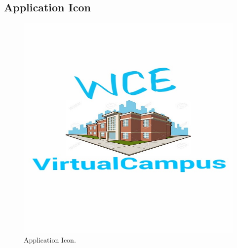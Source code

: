 \documentclass{article}
\begin{document}
\subsection{Application Icon}
\begin{center}
\begin{figure}[h]
	\includegraphics[scale=.2]{Icon.png}
	\caption{Application Icon. }
\end{figure}
\end{center}
\vspace{5cm}
\end{document}

